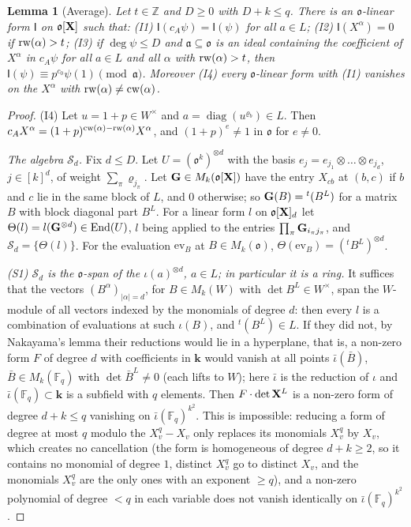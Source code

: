 \documentclass[10pt]{amsart}
\newtheorem{lemma}[theorem]{Lemma}
\theoremstyle{definition}
\theoremstyle{remark}
\newcommand{\Z}{\mathbb Z}
\providecommand{\auF}{\mathbb F}
\providecommand{\pao}{\mathfrak o}
\providecommand{\phk}{\boldsymbol k}
\begin{document}
\begin{lemma}[Average]\label{pe:avg}
Let $t\in\Z$ and $D\ge0$ with $D+k\le q$. There is an $\pao$-linear form $\mathsf I$ on $\pao[\peX]$
such that: {\rm(I1)} $\mathsf I(c_A\psi)=\mathsf I(\psi)$ for all $a\in L$; {\rm(I2)} $\mathsf
I(X^\alpha)=0$ if $\operatorname{rw}(\alpha)>t$; {\rm(I3)} if $\deg\psi\le D$ and $\mathfrak a\subseteq\pao$ is an ideal
containing the coefficient of $X^\alpha$ in $c_A\psi$ for all $a\in L$ and all $\alpha$ with
$\operatorname{rw}(\alpha)>t$, then $\mathsf I(\psi)\equiv p^{c_0}\psi(1)\pmod{\mathfrak a}$. Moreover {\rm(I4)} every
$\pao$-linear form with {\rm(I1)} vanishes on the $X^\alpha$ with $\operatorname{rw}(\alpha)\ne\operatorname{cw}(\alpha)$.
\end{lemma}
\begin{proof}
(I4) Let $u=1+p\in W^\times$ and $a=\operatorname{diag}(u^{\varrho_b})\in L$. Then
$c_AX^\alpha=(1+p)^{\operatorname{cw}(\alpha)-\operatorname{rw}(\alpha)}X^\alpha$, and $(1+p)^e\ne1$ in $\pao$ for
$e\ne0$.

\emph{The algebra $\mathcal S_d$.} Fix $d\le D$. Let $U=(\pao^k)^{\otimes d}$ with the basis
$e_j=e_{j_1}\otimes\dots\otimes e_{j_d}$, $j\in[k]^d$, of weight $\sum_\pi\varrho_{j_\pi}$. Let
$\peG\in M_k(\pao[\peX])$ have the entry $X_{cb}$ at $(b,c)$ if $b$ and $c$ lie in the same block
of $L$, and $0$ otherwise; so $\mathbf G(B)={}^t(B^L)$ for a matrix $B$ with block diagonal part $B^L$.
For a linear form $l$ on $\pao[\peX]_d$ let $\Theta(l)=l(\mathbf G^{\otimes d})\in\operatorname{End}
(U)$, $l$ being applied to the entries $\prod_\pi\mathbf G_{i_\pi j_\pi}$, and $\mathcal S_d=\{\Theta(l)\}$. For the evaluation $\mathrm{ev}_B$ at $B\in M_k(\pao)$, $\Theta(\mathrm{ev}_B)=({}^t
B^L)^{\otimes d}$.

\emph{{\rm(S1)} $\mathcal S_d$ is the $\pao$-span of the $\iota(a)^{\otimes d}$, $a\in L$; in
particular it is a ring.} It suffices that the vectors $(B^\alpha)_{|\alpha|=d}$, for $B\in M_k(W)$
with $\det B^L\in W^\times$, span the $W$-module of all vectors indexed by the monomials of degree
$d$: then every $l$ is a combination of evaluations at such $\iota(B)$, and ${}^t(B^L)\in L$. If
they did not, by Nakayama's lemma their reductions would lie in a hyperplane, that is, a non-zero
form $F$ of degree $d$ with coefficients in $\phk$ would vanish at all points $\bar\iota(\bar B)$,
$\bar B\in M_k(\auF_q)$ with $\det\bar B^L\ne0$ (each lifts to $W$); here $\bar\iota$ is the
reduction of $\iota$ and $\bar\iota(\auF_q)\subset\phk$ is a subfield with $q$ elements. Then $F\cdot\det\mathbf X^L$ is a non-zero form of degree $d+k\le q$
vanishing on $\bar\iota(\auF_q)^{k^2}$. This is impossible: reducing a form of degree at most $q$ modulo the
$X_v^q-X_v$ only replaces its monomials $X_v^q$ by $X_v$, which creates no cancellation (the form is homogeneous of degree $d+k\ge2$, so it contains no
monomial of degree $1$, distinct $X_v^q$ go to distinct $X_v$, and the monomials $X_v^q$ are the
only ones with an exponent $\ge q$),
and a non-zero polynomial of degree $<q$ in each variable does not vanish identically on $\bar\iota(\auF_q)^{k^2}$.


\end{proof}
\end{document}
